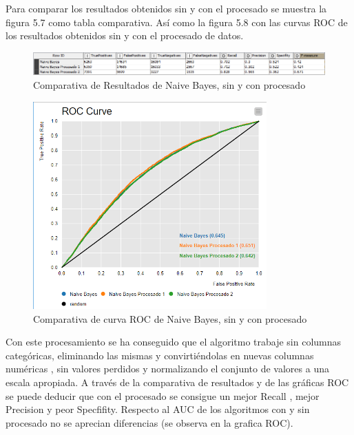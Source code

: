 	Para comparar los resultados obtenidos sin y con el procesado se muestra la figura 5.7 como tabla comparativa. Así como la figura 5.8 con las curvas ROC de los resultados obtenidos sin y con el procesado de datos.
	
	\begin{figure}[htb]
		\centering
		\includegraphics[width=1.0\textwidth]{./imagenes/64}
		\caption{Comparativa de Resultados de Naive Bayes, sin y con procesado} \label{fig:1}
	\end{figure}
	
	\begin{figure}[htb]
		\centering
		\includegraphics[width=0.8\textwidth]{./imagenes/65}
		\caption{Comparativa de curva ROC de Naive Bayes, sin y con procesado} \label{fig:1}
	\end{figure}
	
	Con este procesamiento se ha conseguido que el algoritmo trabaje sin columnas categóricas, eliminando las mismas y convirtiéndolas en nuevas columnas numéricas , sin valores perdidos y normalizando el conjunto de valores a una escala apropiada. A través de la comparativa de resultados y de las gráficas ROC se puede deducir que con el procesado se consigue un mejor Recall , mejor Precision y peor Specfifity. Respecto al AUC de los algoritmos con y sin procesado no se aprecian diferencias (se observa en la grafica ROC).
	
